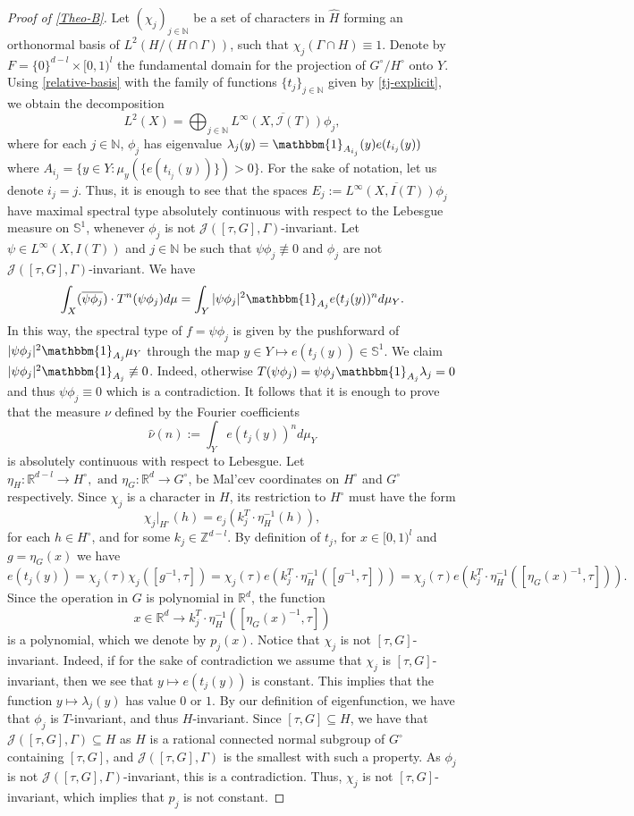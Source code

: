 \documentclass[10pt,a4paper]{amsart}
\newcommand{\N}{\mathbb{N}}
\newcommand{\R}{\mathbb{R}}
\newcommand{\Z}{\mathbb{Z}}
\newcommand{\bS}{\mathbb{S}}
\newcommand{\ind}[1]{\mathbbm{1}_{#1}}
\begin{document}
\begin{proof}[Proof of \cref{Theo-B}]
Let $(\chi_j)_{j\in \N}$ be a set of characters in $\widehat{H}$ forming an orthonormal basis of $L^2(H/(H\cap \Gamma))$, such that $\chi_j(\Gamma\cap H)\equiv 1$. Denote by $F= \{0\}^{d-l} \times [0,1)^l$ the fundamental domain for the projection of $G^\circ/H^\circ$ onto $Y$. Using  \cref{relative-basis}  with the family of functions $\{t_j\}_{j\in \N}$ given by \cref{tj-explicit}, we obtain the decomposition
    $$L^2(X)= \bigoplus_{j\in \N} \overline{L^{\infty}(X,\mathcal{I}(T)) \phi_j  }, $$
    where for each $j\in \N$, $\phi_j$ has eigenvalue $\lambda_j(y)=  \ind{A_{i_j}}(y) e(t_{i_j}(y))$ where $A_{i_j}=\{y \in Y : \mu_y(\{e(t_{i_j}(y))\})>0 \}.$ For the sake of notation, let us denote $i_j=j$. Thus, it is enough to see that the spaces $E_j:=  \overline{ L^\infty(X,I(T))  \phi_j} $ have maximal spectral type absolutely continuous with respect to the Lebesgue measure on $\bS^1$, whenever $\phi_j$ is not $\mathcal{J}([\tau,G],\Gamma)$-invariant. Let $\psi \in L^\infty(X,I(T))$ and $j \in \N$ be such that $\psi\phi_j\not\equiv 0$ and $\phi_j$ are not $\mathcal{J}([\tau,G],\Gamma)$-invariant. We have 
$$\int_X (\overline{\psi\phi_j})\cdot T^n(\psi\phi_j) d\mu=\int_Y |\psi \phi_j|^2 \ind{A_j} e(t_j(y))^nd\mu_Y. $$
In this way, the spectral type of $f= \psi\phi_j$ is given by the pushforward of $|\psi \phi_j|^2\ind{A_j}\mu_Y  $  through the map $y\in Y \mapsto e(t_j(y))\in \bS^1$. We claim $|\psi \phi_j|^2 \ind{A_j}\not\equiv 0$. Indeed, otherwise $T(\psi\phi_j)= \psi \phi_j \ind{A_j} \lambda_j=0$ and thus $\psi\phi_j\equiv 0$ which is a contradiction. It follows that it is enough to prove that the measure $\nu$ defined by the Fourier coefficients
$$\hat{\nu}(n):=\int_Y e(t_j(y))^n d\mu_Y  $$
is absolutely continuous with respect to Lebesgue. Let $\eta_{H}:\R^{d-l}\to H^\circ, \text{ and }\eta_{G}: \R^d \to G^\circ$, be Mal'cev coordinates on $H^\circ$ and $G^\circ$ respectively. Since $\chi_j$ is a character in $H$, its restriction to $H^\circ$ must have the form
$$\chi_j|_{H^\circ}(h)= e_j( k_j^T \cdot \eta_H^{-1}(h) ) ,$$
for each $h\in H^\circ$, and for some $k_j\in \Z^{d-l}$. By definition of $t_j$, for $x\in [0,1)^l$ and $g=\eta_G(x)$ we have
$$e(t_j(y))= \chi_j(\tau) \chi_j([g^{-1},\tau] )= \chi_j(\tau) e( k_j^T \cdot \eta_H^{-1}([g^{-1},\tau] ))=\chi_j(\tau) e( k_j^T \cdot \eta_H^{-1}([\eta_G(x)^{-1},\tau] )). $$
Since the operation in $G$ is polynomial in $\R^d$, the function
$$x\in \R^d \to k_j^T \cdot \eta_H^{-1}([\eta_G(x)^{-1},\tau] ) $$
is a polynomial, which we denote by $p_j(x)$. Notice that $\chi_j$ is not $[\tau,G]$-invariant. Indeed, if for the sake of contradiction we assume that $\chi_j$ is $[\tau,G]$-invariant, then we see that $y\mapsto e(t_j(y))$ is constant. This implies that the function $y\mapsto \lambda_j(y)$ has value $0$ or $1$. By our definition of eigenfunction, we have that $\phi_j$ is $T$-invariant, and thus $H$-invariant. Since $[\tau,G]\subseteq H$, we have that $\mathcal{J}([\tau,G],\Gamma)\subseteq H$  as $H$ is a rational connected normal subgroup of $G^\circ$ containing $[\tau,G]$, and $\mathcal{J}([\tau,G],\Gamma)$ is the smallest with such a property. As $\phi_j$ is not $\mathcal{J}([\tau,G],\Gamma)$-invariant, this is a contradiction. Thus, $\chi_j$ is not $[\tau,G]$-invariant, which implies that $p_j$ is not constant. 

\end{proof}
\end{document}
